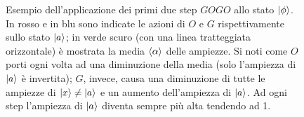 \begin{figure}[!ht]
	 \quad
	\caption{Esempio dell'applicazione dei primi due step $GOGO$ allo stato $\ket{\phi}$. In rosso e in blu sono indicate le azioni di $O$ e $G$ rispettivamente sullo stato $\ket{a}$; in verde scuro (con una linea tratteggiata orizzontale) è mostrata la media $\expval{\alpha}$ delle ampiezze. Si noti come $O$ porti ogni volta ad una diminuzione della media (solo l'ampiezza di $\ket{a}$ è invertita); $G$, invece, causa una diminuzione di tutte le ampiezze di $\ket{x} \neq \ket{a}$ e un aumento dell'ampiezza di $\ket{a}$. Ad ogni step l'ampiezza di $\ket{a}$ diventa sempre più alta tendendo ad 1.}
\label{fig:plot_Grover}
\end{figure}

